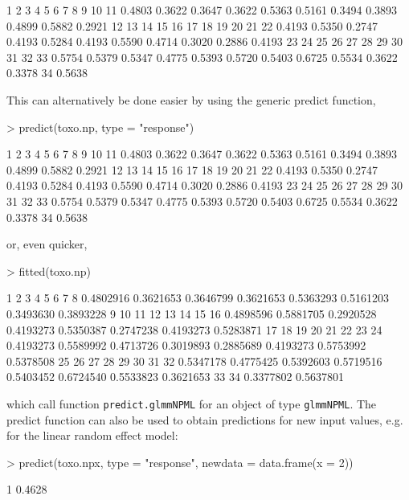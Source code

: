 \documentclass[a4paper]{article}
\begin{document}
\begin{landscape}
\begin{Schunk}
\begin{Soutput}
     1      2      3      4      5      6      7      8      9     10     11 
0.4803 0.3622 0.3647 0.3622 0.5363 0.5161 0.3494 0.3893 0.4899 0.5882 0.2921 
    12     13     14     15     16     17     18     19     20     21     22 
0.4193 0.5350 0.2747 0.4193 0.5284 0.4193 0.5590 0.4714 0.3020 0.2886 0.4193 
    23     24     25     26     27     28     29     30     31     32     33 
0.5754 0.5379 0.5347 0.4775 0.5393 0.5720 0.5403 0.6725 0.5534 0.3622 0.3378 
    34 
0.5638 
\end{Soutput}
\end{Schunk}
This can alternatively be done easier by using the generic predict function,
\begin{Schunk}
\begin{Sinput}
> predict(toxo.np, type = "response")
\end{Sinput}
\begin{Soutput}
     1      2      3      4      5      6      7      8      9     10     11 
0.4803 0.3622 0.3647 0.3622 0.5363 0.5161 0.3494 0.3893 0.4899 0.5882 0.2921 
    12     13     14     15     16     17     18     19     20     21     22 
0.4193 0.5350 0.2747 0.4193 0.5284 0.4193 0.5590 0.4714 0.3020 0.2886 0.4193 
    23     24     25     26     27     28     29     30     31     32     33 
0.5754 0.5379 0.5347 0.4775 0.5393 0.5720 0.5403 0.6725 0.5534 0.3622 0.3378 
    34 
0.5638 
\end{Soutput}
\end{Schunk}
or, even quicker,
\begin{Schunk}
\begin{Sinput}
> fitted(toxo.np)
\end{Sinput}
\begin{Soutput}
        1         2         3         4         5         6         7         8 
0.4802916 0.3621653 0.3646799 0.3621653 0.5363293 0.5161203 0.3493630 0.3893228 
        9        10        11        12        13        14        15        16 
0.4898596 0.5881705 0.2920528 0.4193273 0.5350387 0.2747238 0.4193273 0.5283871 
       17        18        19        20        21        22        23        24 
0.4193273 0.5589992 0.4713726 0.3019893 0.2885689 0.4193273 0.5753992 0.5378508 
       25        26        27        28        29        30        31        32 
0.5347178 0.4775425 0.5392603 0.5719516 0.5403452 0.6724540 0.5533823 0.3621653 
       33        34 
0.3377802 0.5637801 
\end{Soutput}
\end{Schunk}
 which call function {\tt predict.glmmNPML} for an object of type {\tt glmmNPML}. 
 The predict function can also be used to obtain predictions for new input values, e.g. for the linear random effect model:
\begin{Schunk}
\begin{Sinput}
> predict(toxo.npx, type = "response", newdata = data.frame(x = 2))
\end{Sinput}
\begin{Soutput}
     1 
0.4628 
\end{Soutput}
\end{Schunk}


\end{landscape}
\end{document}
